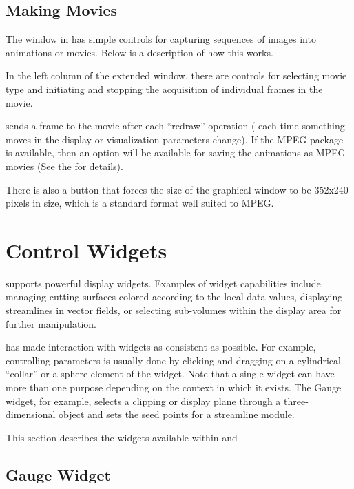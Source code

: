 \subsection{Making Movies}
\label{sec:view-movies} 

The \viewer{} window in \SR{} has simple controls for capturing sequences
of images into animations or movies.  Below is a description of how this works.

In the left column of the extended \viewer{} window, there are controls for
selecting movie type and initiating and stopping the acquisition of
individual frames in the movie.

\SR{} sends a frame to the movie after each ``redraw'' operation ( \ie{}
each time something moves in the display or visualization parameters
change).  If the MPEG package is available, then an option will be available for saving the animations as MPEG movies (See the
 for details).

There is also a button that forces the size of the graphical window to be
352x240 pixels in size, which is a standard format well suited to MPEG.

\section{Control Widgets}
\label{sec:view-widgets} 

\SR{} supports powerful display widgets.  Examples of widget
capabilities include managing cutting surfaces colored according to
the local data values, displaying streamlines in vector fields, or
selecting sub-volumes within the display area for further
manipulation.
 
\sci{} has made interaction with widgets as consistent as
possible. For example, controlling parameters is usually done by
clicking and dragging on a cylindrical ``collar'' or a sphere element
of the widget. Note that a single widget can have more than one
purpose depending on the context in which it exists. The Gauge widget,
for example, selects a clipping or display plane through a
three-dimensional object and sets the seed points for a streamline
module.

This section describes the widgets available within \SR{} and \BIOPSE{}.
 
\subsection{Gauge Widget}
\label{sec:view-gaugewidget} 

